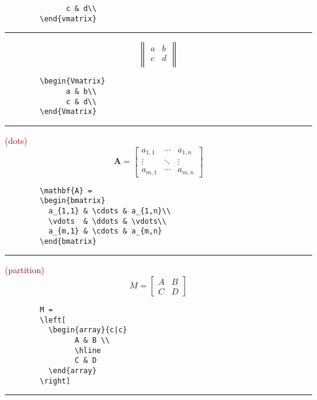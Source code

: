 \documentclass[a4paper,10pt,landscape]{article}
\newcommand{\hSep}{{\color{colorSep}\hrule}}
\theoremstyle{definition}
\theoremstyle{remark}
\newcommand{\hDesc}[1]{\textcolor{darkred}{(#1)}} %
\begin{document}
\begin{multicols}{3}
\begin{multicols}{2}
\begin{verbatim}
			  c & d\\
		\end{vmatrix}
	\end{verbatim}
\end{multicols}
\hSep
\begin{multicols}{2}
	\[
		\begin{Vmatrix}
			  a & b\\
			  c & d\\
		\end{Vmatrix}
	\]
\columnbreak
	\begin{verbatim}
		\begin{Vmatrix}
			  a & b\\
			  c & d\\
		\end{Vmatrix}
	\end{verbatim}
\end{multicols}
\hSep
\begin{multicols}{2}
	\hDesc{dots}
	\[
		\mathbf{A} = 
		\begin{bmatrix}
		  a_{1,1} & \cdots & a_{1,n}\\
		  \vdots  & \ddots & \vdots\\
		  a_{m,1} & \cdots & a_{m,n}
		\end{bmatrix}
	\]
\columnbreak
	\begin{verbatim}
		\mathbf{A} = 
		\begin{bmatrix}
		  a_{1,1} & \cdots & a_{1,n}\\
		  \vdots  & \ddots & \vdots\\
		  a_{m,1} & \cdots & a_{m,n}
		\end{bmatrix}
	\end{verbatim}
\end{multicols}
\hSep
\begin{multicols}{2}
	\hDesc{partition}
	\[
		M =
		\left[
		\begin{array}{c|c}
			A & B \\
			\hline
			C & D
		\end{array}
		\right]
	\]
\columnbreak
	\begin{verbatim}
		M =
		\left[
		  \begin{array}{c|c}
			    A & B \\
			    \hline
			    C & D
		  \end{array}
		\right]
	\end{verbatim}
\end{multicols}
\hSep





\end{multicols}
\end{document}
